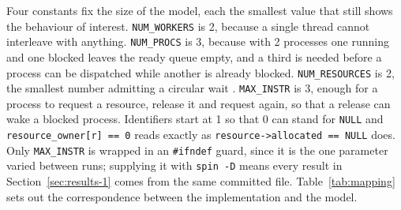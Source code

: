 \documentclass[10pt,a4paper]{article}
\newcommand{\code}[1]{\texttt{#1}}
\begin{document}
Four constants fix the size of the model, each the smallest value that still
shows the behaviour of interest. \code{NUM\_WORKERS} is 2, because a single
thread cannot interleave with anything. \code{NUM\_PROCS} is 3, because with 2
processes one running and one blocked leaves the ready queue empty, and a
third is needed before a process can be dispatched while another is already
blocked. \code{NUM\_RESOURCES} is 2, the smallest number admitting a circular
wait \cite{baier2008}. \code{MAX\_INSTR} is 3, enough for a process to
request a resource, release it and request again, so that a release can wake a
blocked process. Identifiers start at 1 so that 0 can stand for \code{NULL}
and \code{resource\_owner[r] == 0} reads exactly as
\code{resource->allocated == NULL} does. Only \code{MAX\_INSTR} is wrapped in
an \code{\#ifndef} guard, since it is the one parameter varied between runs;
supplying it with \code{spin -D} means every result in
Section~\ref{sec:results-1} comes from the same committed file.
Table~\ref{tab:mapping} sets out the correspondence between the
implementation and the model.
\end{document}
